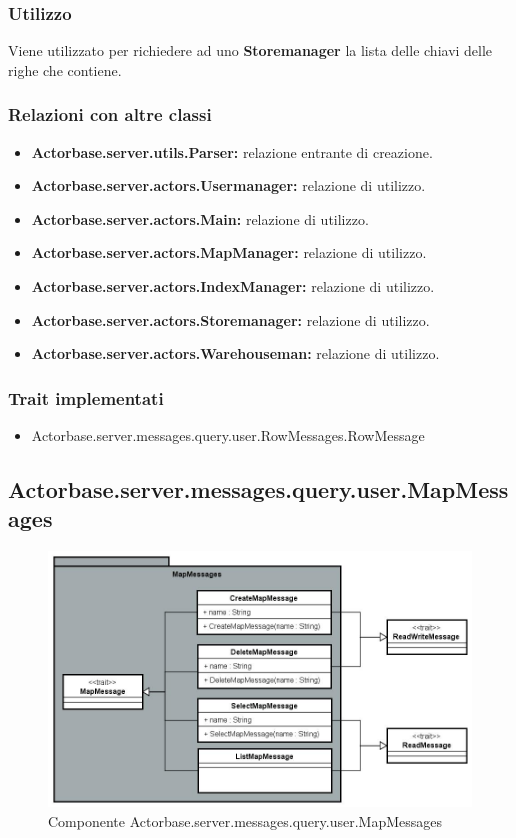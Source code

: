 \documentclass[a4paper]{article}
\begin{document}
			\subsubsection{Utilizzo}
				Viene utilizzato per richiedere ad uno \textbf{Storemanager} la lista delle chiavi delle righe che contiene.
				
			\subsubsection{Relazioni con altre classi}
				\begin{itemize}
					\item \textbf{Actorbase.server.utils.Parser:} relazione entrante di creazione.
					\item \textbf{Actorbase.server.actors.Usermanager:} relazione di utilizzo.
					\item \textbf{Actorbase.server.actors.Main:} relazione di utilizzo.
					\item \textbf{Actorbase.server.actors.MapManager:} relazione di utilizzo.
					\item \textbf{Actorbase.server.actors.IndexManager:} relazione di utilizzo.
					\item \textbf{Actorbase.server.actors.Storemanager:} relazione di utilizzo.
					\item \textbf{Actorbase.server.actors.Warehouseman:} relazione di utilizzo.
				\end{itemize}
			\subsubsection{Trait implementati}
				\begin{itemize}
					\item Actorbase.server.messages.query.user.RowMessages.RowMessage
				\end{itemize}
			
		\subsection{Actorbase.server.messages.query.user.MapMessages}
		
			\begin{figure}[H]
				\centering
				\includegraphics[width=\textwidth]{ST/Server/mapMessagesLevel.jpg}
				\caption{Componente Actorbase.server.messages.query.user.MapMessages}
			\end{figure}
			
\end{document}

